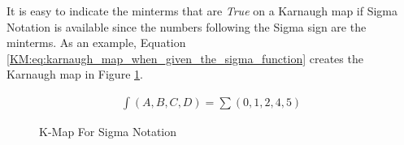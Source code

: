 It is easy to indicate the minterms that are \emph{True} on a Karnaugh map if Sigma Notation is available since the numbers following the Sigma sign are the minterms. As an example, Equation \ref{KM:eq:karnaugh_map_when_given_the_sigma_function} creates the Karnaugh map in Figure \ref{KM:fig:kmap_for_sigma_notation}. 

\begin{align}
  \label{KM:eq:karnaugh_map_when_given_the_sigma_function}
  \int{(A,B,C,D)} = \sum(0,1,2,4,5)
\end{align}

\begin{figure}[H]
  \caption{K-Map For Sigma Notation}
  \label{KM:fig:kmap_for_sigma_notation}
  \myfloatalign
\end{figure}
